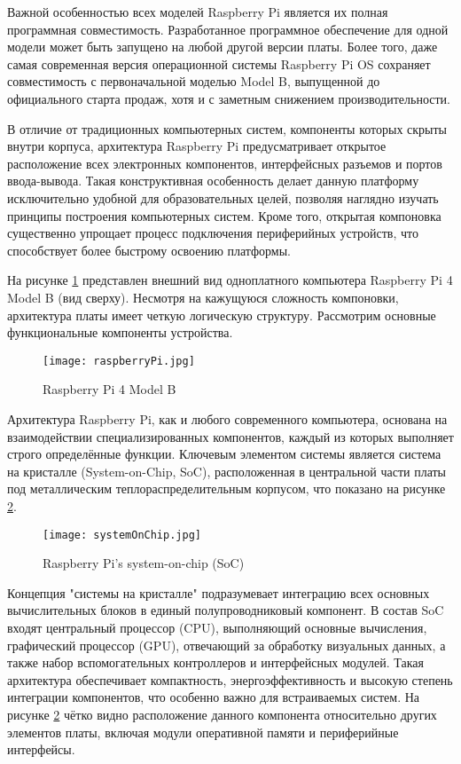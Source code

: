 Важной особенностью всех моделей Raspberry Pi является их полная программная совместимость. Разработанное программное обеспечение для одной модели может быть запущено на любой другой версии платы. Более того, даже самая современная версия операционной системы Raspberry Pi OS сохраняет совместимость с первоначальной моделью Model B, выпущенной до официального старта продаж, хотя и с заметным снижением производительности.

В отличие от традиционных компьютерных систем, компоненты которых скрыты внутри корпуса, архитектура Raspberry Pi предусматривает открытое расположение всех электронных компонентов, интерфейсных разъемов и портов ввода-вывода. Такая конструктивная особенность делает данную платформу исключительно удобной для образовательных целей, позволяя наглядно изучать принципы построения компьютерных систем. Кроме того, открытая компоновка существенно упрощает процесс подключения периферийных устройств, что способствует более быстрому освоению платформы.

На рисунке \ref{fig:raspberry4B} представлен внешний вид одноплатного компьютера Raspberry Pi 4 Model B (вид сверху). Несмотря на кажущуюся сложность компоновки, архитектура платы имеет четкую логическую структуру. Рассмотрим основные функциональные компоненты устройства.

\begin{figure}[H]
	\centering
	\texttt{[image: raspberryPi.jpg]}
	\caption{Raspberry Pi 4 Model B}
	\label{fig:raspberry4B}
\end{figure}

Архитектура Raspberry Pi, как и любого современного компьютера, основана на взаимодействии специализированных компонентов, каждый из которых выполняет строго определённые функции. Ключевым элементом системы является система на кристалле (System-on-Chip, SoC), расположенная в центральной части платы под металлическим теплораспределительным корпусом, что показано на рисунке \ref{fig:soc}. 

\begin{figure}[H]
	\centering
	\texttt{[image: systemOnChip.jpg]}
	\caption{Raspberry Pi’s system-on-chip (SoC)}
	\label{fig:soc}
\end{figure}

Концепция "системы на кристалле" подразумевает интеграцию всех основных вычислительных блоков в единый полупроводниковый компонент. В состав SoC входят центральный процессор (CPU), выполняющий основные вычисления, графический процессор (GPU), отвечающий за обработку визуальных данных, а также набор вспомогательных контроллеров и интерфейсных модулей. Такая архитектура обеспечивает компактность, энергоэффективность и высокую степень интеграции компонентов, что особенно важно для встраиваемых систем. На рисунке \ref{fig:soc} чётко видно расположение данного компонента относительно других элементов платы, включая модули оперативной памяти и периферийные интерфейсы.

